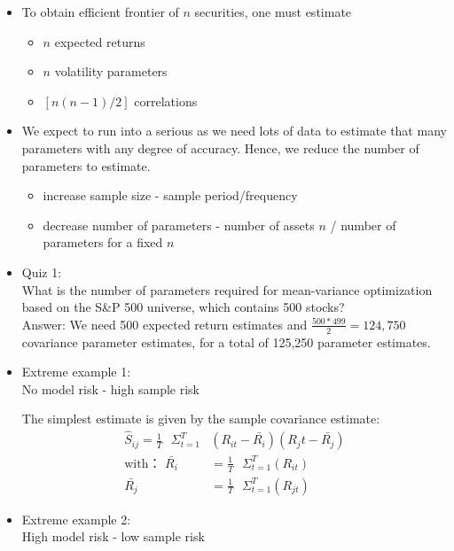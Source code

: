 \documentclass{maths}
\begin{document}
\begin{itemize}

\item To obtain efficient frontier of $n$ securities, one must estimate
\begin{itemize}
\item $n$ expected returns
\item $n$ volatility parameters
\item $[n(n-1)/2]$ correlations \\
\end{itemize}

\item We expect to run into a serious as we need lots of data to estimate that many parameters with any degree of accuracy. Hence, we reduce the number of parameters to estimate.
\begin{itemize}
\item increase sample size - sample period/frequency
\item decrease number of parameters - number of assets $n$ / number of parameters for a fixed $n$\\
\end{itemize}

\item Quiz 1:\\ What is the number of parameters required for mean-variance optimization based on the S\&P 500 universe, which contains 500 stocks?\\

Answer: We need 500 expected return estimates and $\frac{500*499}{2}=124,750$ covariance parameter estimates, for a total of 125,250 parameter estimates.\\

\item Extreme example 1:\\ No model risk - high sample risk

The simplest estimate is given by the sample covariance estimate:
\begin{align*}
\hat{S}_{ij} = \frac{1}{T}\text{ }\Sigma_{t=1}^{T}&\left(R_{it}-\bar{R_i}\right)\left(R_jt-\bar{R_j}\right)\\
\text{with： } \bar{R_i} &= \frac{1}{T} \text{ }\Sigma_{t=1}^{T}\left(R_{it}\right)\\
\bar{R_j} &= \frac{1}{T} \text{ }\Sigma_{t=1}^{T}\left(R_{jt}\right)
\end{align*}

\item Extreme example 2:\\ High model risk - low sample risk


\end{itemize}
\end{document}
